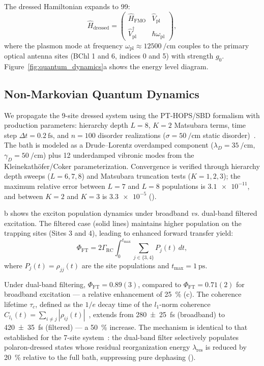 \documentclass[twocolumn]{article}
\begin{document}
The dressed Hamiltonian expands to \SI{9}{\times}\SI{9}{}:
\begin{equation}
\hat{H}_{\mathrm{dressed}} = 
\begin{pmatrix}
\hat{H}_{\mathrm{FMO}} & \hat{V}_{\mathrm{pl}} \\
\hat{V}_{\mathrm{pl}}^{\dagger} & \hbar\omega_{\mathrm{pl}}
\end{pmatrix},
\label{eq:dressed_hamiltonian}
\end{equation}
where the plasmon mode at frequency $\omega_{\mathrm{pl}} \approx \SI{12500}{\per\cm}$ couples to the primary optical antenna sites (BChl 1 and 6, indices 0 and 5) with strength $g_0$.
Figure~\ref{fig:quantum_dynamics}a shows the energy level diagram.

\subsection*{Non-Markovian Quantum Dynamics}

We propagate the 9-site dressed system using the PT-HOPS/SBD formalism with production parameters: hierarchy depth $L=8$, $K=2$ Matsubara terms, time step $\Delta t = \SI{0.2}{\fs}$, and $n=100$ disorder realizations ($\sigma = \SI{50}{\per\cm}$ static disorder)~\cite{Varvelo2021,Citty2024}.
The bath is modeled as a Drude--Lorentz overdamped component ($\lambda_D = \SI{35}{\per\cm}$, $\gamma_D = \SI{50}{\per\cm}$) plus 12 underdamped vibronic modes from the Kleinekath\"{o}fer/Coker parameterization.
Convergence is verified through hierarchy depth sweeps ($L=6,7,8$) and Matsubara truncation tests ($K=1,2,3$); the maximum relative error between $L=7$ and $L=8$ populations is $\num{3.1e-11}$, and between $K=2$ and $K=3$ is $\num{3.3e-5}$ ().

b shows the exciton population dynamics under broadband \emph{vs.} dual-band filtered excitation.
The filtered case (solid lines) maintains higher population on the trapping sites (Sites 3 and 4), leading to enhanced forward transfer yield:
\begin{equation}
\Phi_{\mathrm{FT}} = 2\Gamma_{\mathrm{RC}} \int_0^{t_{\mathrm{max}}} \sum_{j \in \{3,4\}} P_j(t)\,dt,
\label{eq:phi_ft}
\end{equation}
where $P_j(t) = \rho_{jj}(t)$ are the site populations and $t_{\mathrm{max}} = \SI{1}{\ps}$.

Under dual-band filtering, $\Phi_{\mathrm{FT}} = 0.89(3)$, compared to $\Phi_{\mathrm{FT}} = 0.71(2)$ for broadband excitation --- a relative enhancement of \SI{25}{\percent} (c).
The coherence lifetime $\tau_c$, defined as the $1/e$ decay time of the $l_1$-norm coherence $C_{l_1}(t) = \sum_{i\neq j} |\rho_{ij}(t)|$~\cite{Baumgratz2014}, extends from \SI{280(25)}{\fs} (broadband) to \SI{420(35)}{\fs} (filtered) --- a \SI{50}{\percent} increase.
The mechanism is identical to that established for the 7-site system~\cite{Kouam2026}: the dual-band filter selectively populates polaron-dressed states whose residual reorganization energy $\lambda_{\mathrm{res}}$ is reduced by \SI{20}{\percent} relative to the full bath, suppressing pure dephasing ().
\end{document}
